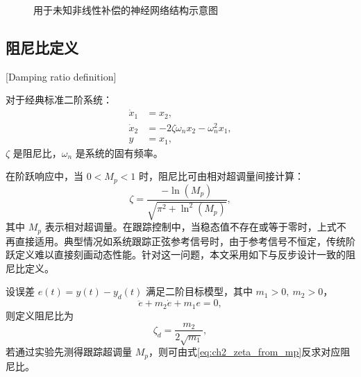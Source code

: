 \begin{figure}[htbp]
{%
  }
  \caption{用于未知非线性补偿的神经网络结构示意图}
  \label{fig:ch2_nn_structure}
\end{figure}
\FloatBarrier




\subsection{阻尼比定义}[Damping ratio definition]

对于经典标准二阶系统：
\begin{subequations}\label{eq:ch2_std_2nd}
\begin{align}
\dot{x}_1&=x_2,\\
\dot{x}_2&=-2\zeta\omega_nx_2-\omega_n^2x_1,\\
y&=x_1,
\end{align}
\end{subequations}
$\zeta$ 是阻尼比，$\omega_n$ 是系统的固有频率。

在阶跃响应中，当 $0<M_p<1$ 时，阻尼比可由相对超调量间接计算：
\begin{equation}\label{eq:ch2_zeta_from_mp}
\zeta=\frac{-\ln(M_p)}{\sqrt{\pi^2+\ln^2(M_p)}},
\end{equation}
其中 $M_p$ 表示相对超调量。在跟踪控制中，当稳态值不存在或等于零时，上式不再直接适用。典型情况如系统跟踪正弦参考信号时，由于参考信号不恒定，传统阶跃定义难以直接刻画动态性能。针对这一问题，本文采用如下与反步设计一致的阻尼比定义。

\begin{definition}\label{def:ch2_zeta}
设误差 $e(t)=y(t)-y_d(t)$ 满足二阶目标模型，其中 $m_1>0,\ m_2>0$，
\begin{equation}\label{eq:ch2_err_model}
\ddot e+m_2\dot e+m_1e=0,
\end{equation}
则定义阻尼比为
\begin{equation}\label{eq:ch2_zeta_def}
\zeta_d=\frac{m_2}{2\sqrt{m_1}},
\end{equation}
若通过实验先测得跟踪超调量 $M_p$，则可由式\eqref{eq:ch2_zeta_from_mp}反求对应阻尼比。
\end{definition}

